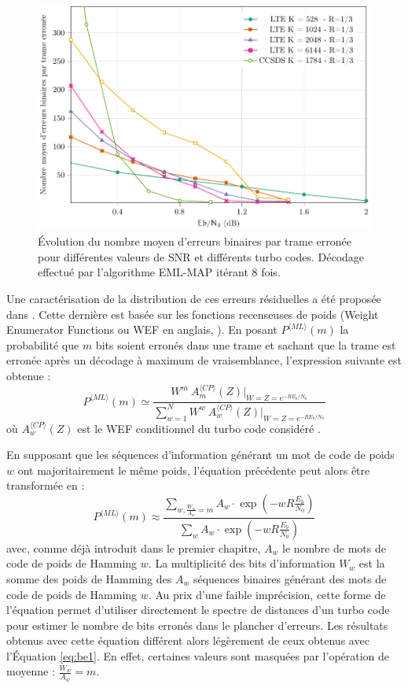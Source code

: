\begin{figure}[!b]
	\centering
	\includegraphics[width=.8\textwidth]{main/ch3_fig/be/tikz/befe.pdf}
	\caption{Évolution du nombre moyen d'erreurs binaires par trame erronée pour différentes valeurs de SNR et différents
	turbo codes. Décodage effectué par l'algorithme EML-MAP itérant 8 fois. \label{fig:befe}}
\end{figure}

Une caractérisation de la distribution de ces erreurs 
résiduelles a été proposée dans \cite{residual_errors}. Cette dernière est basée sur les fonctions recenseuses de poids
(Weight Enumerator Functions ou WEF en anglais, \cite{ryan}). En posant $P^{\langle ML\rangle}(m)$ la probabilité que 
$m$ bits soient erronés dans une trame et sachant que la trame est erronée après un décodage à maximum de vraisemblance,
l'expression suivante est obtenue :
\begin{equation}
P^{\langle ML\rangle}(m) \simeq \frac{W^m~A_m^{\langle CP\rangle}(Z)\vert_{W=Z=e^{-RE_b/N_0}}}{\sum\limits_{w=1}^N W^w~A_w^{\langle CP\rangle}(Z) \vert_{W=Z=e^{-RE_b/N_0}}}
\label{eq:be1}
\end{equation}
où $A_w^{\langle CP\rangle}(Z)$ est le WEF conditionnel du turbo code considéré \cite{benedetto_unveiling}.

En supposant que les séquences d'information 
générant un mot de code de poids $w$ ont majoritairement le même poids, l'équation précédente peut alors être transformée 
en : 
\begin{equation}
P^{\langle ML\rangle}(m) \approx \frac{\displaystyle\sum\limits_{w, \frac{W_w}{A_w}=m} A_w\cdot \exp\left(-w R \frac{E_b}{N_0}\right)}
                  {\displaystyle\sum\limits_{w} A_w\cdot \exp\left(-w R \frac{E_b}{N_0}\right)}
\label{eq:be2}
\end{equation}
avec, comme déjà introduit dans le premier chapitre, $A_w$ le nombre de mots de code de poids de Hamming $w$. La 
multiplicité des bits d'information $W_w$ est la somme des poids de Hamming des $A_w$ séquences binaires générant des
mots de code de poids de Hamming $w$. Au prix d'une faible imprécision, cette forme de l'équation permet d'utiliser 
directement le spectre de distances d'un turbo code pour estimer le nombre de bits erronés dans le plancher d'erreurs. Les
résultats obtenus avec cette équation différent alors légèrement de ceux obtenus avec l'Équation \ref{eq:be1}. En effet,
certaines valeurs sont masquées par l'opération de moyenne : $\frac{W_w}{A_w}=m$. 

